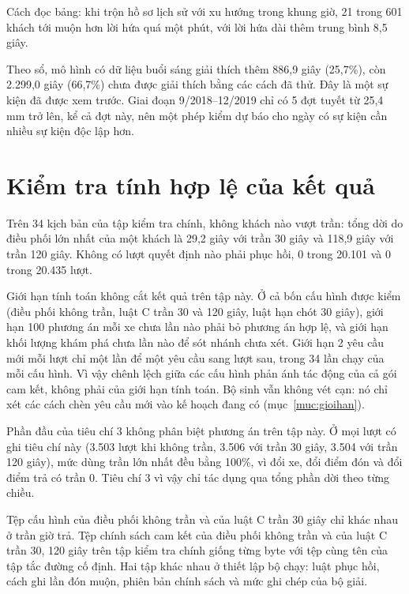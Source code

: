Cách đọc bảng: khi trộn hồ sơ lịch sử với xu hướng trong khung giờ, 21 trong 601 khách tới muộn hơn lời hứa quá một
phút, với lời hứa dài thêm trung bình 8,5 giây.

Theo sổ, mô hình có dữ liệu buổi sáng giải thích thêm 886,9 giây (25,7\%), còn 2.299,0 giây (66,7\%) chưa được giải
thích bằng các cách đã thử. Đây là một sự kiện đã được xem trước. Giai đoạn 9/2018--12/2019 chỉ có 5 đợt tuyết từ
25,4 mm trở lên, kể cả đợt này, nên một phép kiểm dự báo cho ngày có sự kiện cần nhiều sự kiện độc lập hơn.

\section{Kiểm tra tính hợp lệ của kết quả}
\label{muc:c4-hople}

Trên 34 kịch bản của tập kiểm tra chính, không khách nào vượt trần: tổng dời do điều phối lớn nhất của một khách là
29,2 giây với trần 30 giây và 118,9 giây với trần 120 giây. Không có lượt quyết định nào phải phục hồi, 0 trong 20.101
và 0 trong 20.435 lượt.

Giới hạn tính toán không cắt kết quả trên tập này. Ở cả bốn cấu hình được kiểm (điều phối không trần, luật C trần 30
và 120 giây, luật hạn chót 30 giây), giới hạn 100 phương án mỗi xe chưa lần nào phải bỏ phương án hợp lệ, và giới hạn
khối lượng khám phá chưa lần nào để sót nhánh chưa xét. Giới hạn 2 yêu cầu mới mỗi lượt chỉ một lần để một yêu cầu
sang lượt sau, trong 34 lần chạy của mỗi cấu hình. Vì vậy chênh lệch giữa các cấu hình phản ánh tác động của cả gói
cam kết, không phải của giới hạn tính toán. Bộ sinh vẫn không vét cạn: nó chỉ xét các cách chèn yêu cầu mới vào kế
hoạch đang có (mục~\ref{muc:gioihan}).

Phần đầu của tiêu chí 3 không phân biệt phương án trên tập này. Ở mọi lượt có ghi tiêu chí này (3.503 lượt khi không
trần, 3.506 với trần 30 giây, 3.504 với trần 120 giây), mức dùng trần lớn nhất đều bằng 100\%, vì đổi xe, đổi điểm
đón và đổi điểm trả có trần 0. Tiêu chí 3 vì vậy chỉ tác dụng qua tổng phần dời theo từng chiều.

Tệp cấu hình của điều phối không trần và của luật C trần 30 giây chỉ khác nhau ở trần giờ trả. Tệp chính sách cam
kết của điều phối không trần và của luật C trần 30, 120 giây trên tập kiểm tra chính giống từng byte với tệp cùng tên
của tập tắc đường cố định. Hai tập khác nhau ở thiết lập bộ chạy: luật phục hồi, cách ghi lần đón muộn, phiên bản
chính sách và mức ghi chép của bộ giải.

